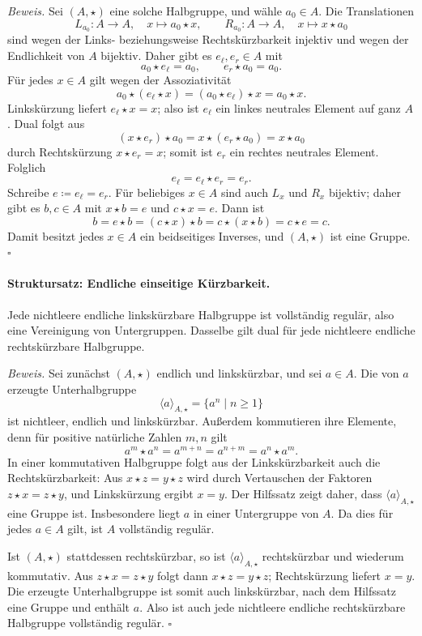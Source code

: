 \documentclass[main.tex]{subfiles}
\begin{document}
\emph{Beweis.}
Sei \((A,\star)\) eine solche Halbgruppe, und wähle \(a_0\in A\).  Die
Translationen
\[
  L_{a_0}\colon A\to A,\quad x\longmapsto a_0\star x,
  \qquad
  R_{a_0}\colon A\to A,\quad x\longmapsto x\star a_0
\]
sind wegen der Links- beziehungsweise Rechtskürzbarkeit injektiv und wegen
der Endlichkeit von \(A\) bijektiv.  Daher gibt es \(e_\ell,e_r\in A\) mit
\[
  a_0\star e_\ell=a_0,
  \qquad
  e_r\star a_0=a_0.
\]
Für jedes \(x\in A\) gilt wegen der Assoziativität
\[
  a_0\star(e_\ell\star x)
  =(a_0\star e_\ell)\star x
  =a_0\star x.
\]
Linkskürzung liefert \(e_\ell\star x=x\); also ist \(e_\ell\) ein linkes
neutrales Element auf ganz \(A\).  Dual folgt aus
\[
  (x\star e_r)\star a_0
  =x\star(e_r\star a_0)
  =x\star a_0
\]
durch Rechtskürzung \(x\star e_r=x\); somit ist \(e_r\) ein rechtes
neutrales Element.  Folglich
\[
  e_\ell=e_\ell\star e_r=e_r.
\]
Schreibe \(e\coloneqq e_\ell=e_r\).  Für beliebiges \(x\in A\) sind auch
\(L_x\) und \(R_x\) bijektiv; daher gibt es \(b,c\in A\) mit \(x\star b=e\) und
\(c\star x=e\).  Dann ist
\[
  b=e\star b=(c\star x)\star b
    =c\star(x\star b)=c\star e=c.
\]
Damit besitzt jedes \(x\in A\) ein beidseitiges Inverses, und
\((A,\star)\) ist eine Gruppe. \(\square\)

\paragraph{Struktursatz: Endliche einseitige Kürzbarkeit.}
Jede nichtleere endliche linkskürzbare Halbgruppe ist vollständig regulär,
also eine Vereinigung von Untergruppen.  Dasselbe gilt dual für jede
nichtleere endliche rechtskürzbare Halbgruppe.

\emph{Beweis.}
Sei zunächst \((A,\star)\) endlich und linkskürzbar, und sei \(a\in A\).
Die von \(a\) erzeugte Unterhalbgruppe
\[
  \langle a\rangle_{A,\star}
  =\{a^n\mid n\geq 1\}
\]
ist nichtleer, endlich und linkskürzbar.
Außerdem kommutieren ihre Elemente, denn für positive natürliche Zahlen
\(m,n\) gilt
\[
  a^m\star a^n=a^{m+n}=a^{n+m}=a^n\star a^m.
\]
In einer kommutativen Halbgruppe folgt aus der Linkskürzbarkeit auch die
Rechtskürzbarkeit: Aus \(x\star z=y\star z\) wird durch Vertauschen der
Faktoren \(z\star x=z\star y\), und Linkskürzung ergibt \(x=y\).
Der Hilfssatz zeigt daher, dass \(\langle a\rangle_{A,\star}\) eine Gruppe
ist.  Insbesondere liegt \(a\) in einer Untergruppe von \(A\).  Da dies für
jedes \(a\in A\) gilt, ist \(A\) vollständig regulär.

Ist \((A,\star)\) stattdessen rechtskürzbar, so ist
\(\langle a\rangle_{A,\star}\) rechtskürzbar und wiederum kommutativ.  Aus
\(z\star x=z\star y\) folgt dann
\(x\star z=y\star z\); Rechtskürzung liefert \(x=y\).  Die erzeugte
Unterhalbgruppe ist somit auch linkskürzbar, nach dem Hilfssatz eine Gruppe
und enthält \(a\).  Also ist auch jede nichtleere endliche rechtskürzbare
Halbgruppe vollständig regulär. \(\square\)
\end{document}
